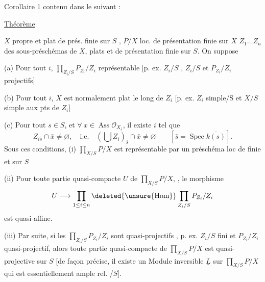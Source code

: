 Corollaire 1  contenu dans le suivant :

\uline{Théorème}

$X$ propre et plat de prés. finie sur $S$ ,
$P/X$ loc. de présentation finie sur $X$
$Z_1\ldots Z_n$ des sous-préschémas  de $X$, plats et de présentation finie
sur $S$. On suppose

(a) Pour tout $i$, $\displaystyle\prod_{Z_i/S}P_{Z_i}/Z_i$ représentable
[p. ex. $Z_i/S$ , 
$Z_i/S$ et $P_{Z_i}/Z_i$ projectifs]

(b) Pour tout $i$, $X$ est normalement plat le long de $Z_i$
[p. ex. $Z_i$ simple/S et $X/S$ simple aux pts de $Z_i$]

(c) Pour tout $s\in S$, et $\forall\ x\in\operatorname{Ass}\mathcal{O}_{X_{\bar s}}$, il existe $i$ tel que
\[
Z_{i\bar s}\cap\bar x\ne\varnothing,\quad\text{i.e.}\quad
(\bigcup Z_i)_{\bar s}\cap\bar x\ne\varnothing\qquad[\bar s=\operatorname{Spec}\overline{k(s)}].
\]
Sous ces conditions, (i) $\displaystyle\prod_{X/S}P/X$ est représentable
par un préschéma loc de   finie et  sur $S$

 (ii) Pour toute partie  quasi-compacte $U$ de
$\displaystyle\prod_{X/S}P/X$, ,
le morphisme
\[
U\longrightarrow\prod_{1\leq i\leq n}\deleted{\unsure{\operatorname{Hom}}}\prod_{Z_i/S}P_{Z_i}/Z_i
\]
est quasi-affine.

(iii) Par suite, si les
$\displaystyle\prod_{Z_i/S}P_{Z_i}/Z_i$ sont quasi-projectifs  ,
p. ex. $Z_i/S$ fini et $P_{Z_i}/Z_i$
quasi-projectif, alors toute partie quasi-compacte de
$\displaystyle\prod_{X/S}P/X$ est quasi-projective sur $S$ [de façon précise, il
existe un Module inversible $\underline L$ sur $\displaystyle\prod_{X/S}P/X$ qui est
essentiellement ample rel. /$S$].
